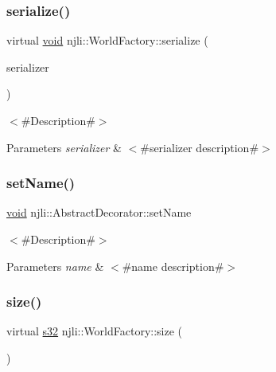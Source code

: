 \subsubsection{\texorpdfstring{serialize()}{serialize()}}
{\footnotesize\ttfamily virtual \mbox{\hyperlink{_thread_8h_af1e856da2e658414cb2456cb6f7ebc66}{void}} njli\+::\+World\+Factory\+::serialize (\begin{DoxyParamCaption}\item[{bt\+Serializer $\ast$}]{serializer }\end{DoxyParamCaption})\hspace{0.3cm}{\ttfamily [virtual]}}

$<$\#\+Description\#$>$


\begin{DoxyParams}{Parameters}
{\em serializer} & $<$\#serializer description\#$>$ \\
\hline
\end{DoxyParams}
\mbox{\label{classnjli_1_1_world_factory_a087eb5f8d9f51cc476f12f1d10a3cb95}} 
\subsubsection{\texorpdfstring{set\+Name()}{setName()}}
{\footnotesize\ttfamily \mbox{\hyperlink{_thread_8h_af1e856da2e658414cb2456cb6f7ebc66}{void}} njli\+::\+Abstract\+Decorator\+::set\+Name}

$<$\#\+Description\#$>$


\begin{DoxyParams}{Parameters}
{\em name} & $<$\#name description\#$>$ \\
\hline
\end{DoxyParams}
\mbox{\label{classnjli_1_1_world_factory_ad5d3fc4509c0939fd64f5d8473e915d2}} 
\subsubsection{\texorpdfstring{size()}{size()}}
{\footnotesize\ttfamily virtual \mbox{\hyperlink{_util_8h_aa62c75d314a0d1f37f79c4b73b2292e2}{s32}} njli\+::\+World\+Factory\+::size (\begin{DoxyParamCaption}{ }\end{DoxyParamCaption})\hspace{0.3cm}{\ttfamily [virtual]}}


